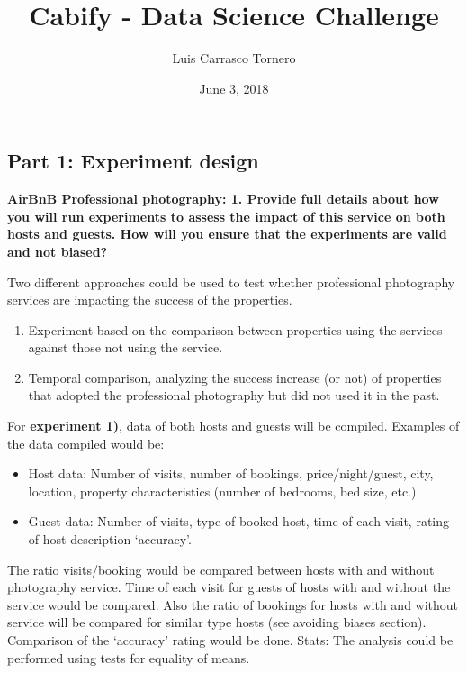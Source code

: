 \documentclass[
]{article}
\title{Cabify - Data Science Challenge}
\author{Luis Carrasco Tornero}
\date{June 3, 2018}
\begin{document}
\maketitle

\hypertarget{part-1-experiment-design}{%
\subsection{Part 1: Experiment design}\label{part-1-experiment-design}}

\textbf{AirBnB Professional photography: 1. Provide full details about
how you will run experiments to assess the impact of this service on
both hosts and guests. How will you ensure that the experiments are
valid and not biased?}

Two different approaches could be used to test whether professional
photography services are impacting the success of the properties.

\begin{enumerate}
\def\labelenumi{\arabic{enumi})}
\item
  Experiment based on the comparison between properties using the
  services against those not using the service.
\item
  Temporal comparison, analyzing the success increase (or not) of
  properties that adopted the professional photography but did not used
  it in the past.
\end{enumerate}

For \textbf{experiment 1)}, data of both hosts and guests will be
compiled. Examples of the data compiled would be:

\begin{itemize}
\item
  Host data: Number of visits, number of bookings, price/night/guest,
  city, location, property characteristics (number of bedrooms, bed
  size, etc.).
\item
  Guest data: Number of visits, type of booked host, time of each visit,
  rating of host description `accuracy'.
\end{itemize}

The ratio visits/booking would be compared between hosts with and
without photography service. Time of each visit for guests of hosts with
and without the service would be compared. Also the ratio of bookings
for hosts with and without service will be compared for similar type
hosts (see avoiding biases section). Comparison of the `accuracy' rating
would be done. Stats: The analysis could be performed using tests for
equality of means.
\end{document}
